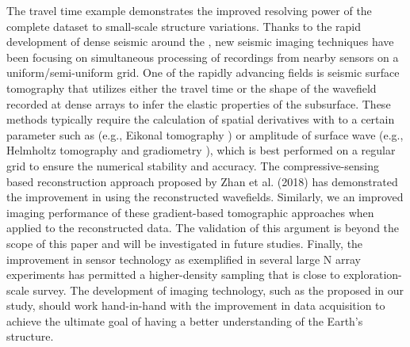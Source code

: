 The travel time example demonstrates the improved resolving power of the complete dataset to small-scale structure variations.  Thanks to the rapid development of dense seismic  around the , new seismic imaging techniques have been focusing on simultaneous processing of recordings from nearby sensors on a uniform/semi-uniform grid. One of the rapidly advancing fields is seismic surface tomography that utilizes either the travel time \cite{lin2009eikonal, jin2015surface} or the shape of the wavefield \cite{lin2011helmholtz, langston2007wave} recorded at dense arrays to infer the elastic properties of the subsurface. These methods typically require the calculation of spatial derivatives with  to a certain parameter such as  (e.g., Eikonal tomography \cite{lin2009eikonal}) or amplitude of  surface wave (e.g., Helmholtz tomography \cite{lin2011helmholtz} and gradiometry \cite{langston2007wave}), which is best performed on a regular grid to ensure the numerical stability and accuracy.  The compressive-sensing based reconstruction approach proposed by Zhan et al. (2018) \cite{zhan2018application} has demonstrated the improvement in  using the reconstructed wavefields.  Similarly, we  an improved imaging performance of these gradient-based tomographic approaches when applied to the reconstructed data.  The validation of this argument is beyond the scope of this paper and will be investigated in future studies. Finally, the improvement in sensor technology as exemplified in several large N array experiments \cite{lin2013high,schmandt2013analysis,hansen2015automated,ward2018high} has permitted a higher-density sampling that is close to  exploration-scale survey. The development of imaging technology, such as the  proposed in our study, should work hand-in-hand with the improvement in data acquisition to achieve the ultimate goal of having a better understanding of the Earth's structure.


